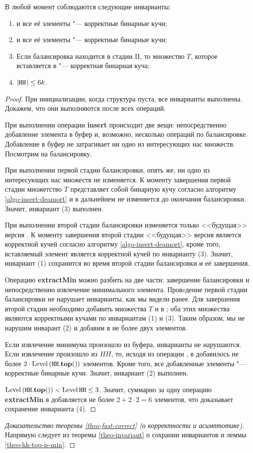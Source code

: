 \begin{theorem} \label{theo-invariant}
В любой момент соблюдаются следующие инварианты:
\begin{enumerate}
\item \MH и все её элементы "--- корректные бинарные кучи;
\item \HH и все её элементы "--- корректные бинарные кучи;
\item Если балансировка находится в стадии II, то множество $T$, которое
вставляется в \MH "--- корректная бинарная куча;
\item $|\texttt{HH}\;\!| \leq 6k$.
\end{enumerate}
\end{theorem}
\begin{proof}
При инициализации, когда структура пуста, все инварианты выполнены. Докажем,
что они выполняются после всех операций.

При выполнении операции \textbf{insert} происходит две вещи: непосредственно добавление
элемента в буфер и, возможно, несколько операций по балансировке. Добавление
в буфер не затрагивает ни одно из интересующих нас множеств. Посмотрим на балансировку.

При выполнении первой стадии балансировки, опять же, ни одно из интересующих
нас множеств не изменяется. К моменту завершения первой стадии множетство
$T$ представляет собой бинарную кучу согласно алгоритму \ref{algo-insert-deamort}
и в дальнейнем не изменяется до окончания балансировки. Значит, инвариант
(3) выполнен.

При выполнении второй стадии балансировки изменяется только <<будущая>>
версия \MH. К моменту завершения второй стадии <<будущая>> версия является
корректной кучей согласно алгоритму \ref{algo-insert-deamort}, кроме того,
вставляемый элемент является корректной кучей по инварианту (3). Значит,
инвариант (1) сохранится во время второй стадии балансировки и её завершения.

Операцию \textbf{extractMin} можно разбить на две части: завершение балансировки
и непосредственно извлечение минимального элемента. Провeдение первой стадии
балансировки не нарушает инварианты, как мы видели ранее. Для завершения
второй стадии необходимо добавить множества $T$ и \MH в \HH; оба этих множества
являются корректными кучами по инвариантам (1) и (3). Таким образом, мы не нарушим
инварант (2) и добавим в \HH не более двух элементов.

Если извлечение минимума произошло из буфера, инварианты не нарушаются. Если
извлечение произошло из $HH$, то, исходя из операции \Yield, в \HH
добавилось не более $2 \cdot \operatorname{Level} \left(\texttt{HH}.\mathbf{top}()\right)$ элементов. Кроме того,
все добавленные элементы "--- корректные бинарные кучи. Значит, инвариант (2)
выполнен.

$\operatorname{Level} \left(\texttt{HH}.\mathbf{top}()\right) < \operatorname{Level} \texttt{HH} \leq 3$. Значит, суммарно за одну операцию
\textbf{extractMin} в \HH добавляется не более $2 + 2\cdot 2 = 6$ элементов,
что доказывает сохранение инварианта (4).

\end{proof}

\begin{proof}[Доказательство теоремы \ref{theo-fast-correct} (о корректности и асимптотике)]
Напрямую следует из теоремы \ref{theo-invariant} о сохрании инвариантов и леммы
\ref{theo-hk-top-is-min}.
\end{proof}
